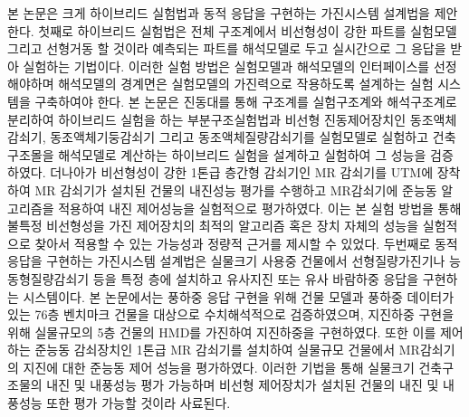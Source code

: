 본 논문은 크게 하이브리드 실험법과 동적 응답을 구현하는 가진시스템 설계법을 제안한다. 첫째로 하이브리드 실험법은 전체 구조계에서 비선형성이 강한 파트를 실험모델 그리고 선형거동 할 것이라 예측되는 파트를 해석모델로 두고 실시간으로 그 응답을 받아 실험하는 기법이다. 이러한 실험 방법은 실험모델과 해석모델의 인터페이스를 선정해야하며 해석모델의 경계면은 실험모델의 가진력으로 작용하도록 설계하는 실험 시스템을 구축하여야 한다. 본 논문은 진동대를 통해 구조계를 실험구조계와 해석구조계로 분리하여 하이브리드 실험을 하는 부분구조실험법과 비선형 진동제어장치인 동조액체감쇠기, 동조액체기둥감쇠기 그리고 동조액체질량감쇠기를 실험모델로 실험하고 건축구조몰을 해석모델로 계산하는 하이브리드 실험을 설계하고 실험하여 그 성능을 검증하였다. 더나아가 비선형성이 강한 1톤급 층간형 감쇠기인 MR 감쇠기를 UTM에 장착하여 MR 감쇠기가 설치된 건물의 내진성능 평가를 수행하고 MR감쇠기에 준능동 알고리즘을 적용하여 내진 제어성능을 실험적으로 평가하였다. 이는 본 실험 방법을 통해  불특정 비선형성을 가진 제어장치의 최적의 알고리즘 혹은 장치 자체의 성능을 실험적으로 찾아서 적용할 수 있는 가능성과 정량적 근거를 제시할 수 있었다. 두번째로 동적 응답을 구현하는 가진시스템 설계법은 실물크기 사용중 건물에서 선형질량가진기나 능동형질량감쇠기 등을 특정 층에 설치하고 유사지진 또는 유사 바람하중 응답을 구현하는 시스템이다. 본 논문에서는 풍하중 응답 구현을 위해 건물 모델과 풍하중 데이터가 있는 76층 벤치마크 건물을 대상으로 수치해석적으로 검증하였으며, 지진하중 구현을 위해 실물규모의 5층 건물의 HMD를 가진하여 지진하중을 구현하였다. 또한 이를 제어하는 준능동 감쇠장치인 1톤급 MR 감쇠기를 설치하여 실물규모 건물에서 MR감쇠기의 지진에 대한 준능동 제어 성능을 평가하였다. 이러한 기법을 통해 실물크기 건축구조물의 내진 및 내풍성능 평가 가능하며 비선형 제어장치가 설치된 건물의 내진 및 내풍성능 또한 평가 가능할 것이라 사료된다.

